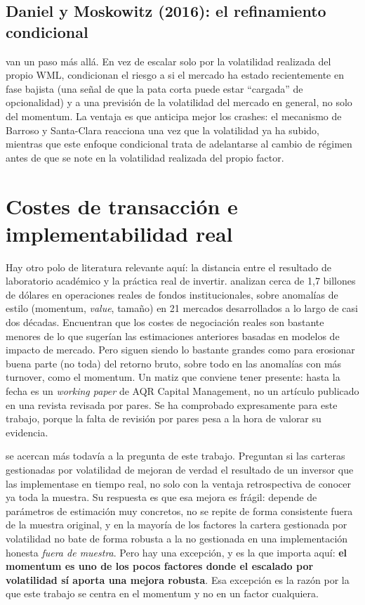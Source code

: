 \documentclass[12pt]{report} %
\begin{document}
\subsection{Daniel y Moskowitz (2016): el refinamiento condicional}

\citet{danielmoskowitz2016} van un paso más allá. En vez de escalar solo por la volatilidad realizada del propio WML, condicionan el riesgo a si el mercado ha estado recientemente en fase bajista (una señal de que la pata corta puede estar ``cargada'' de opcionalidad) y a una previsión de la volatilidad del mercado en general, no solo del momentum. La ventaja es que anticipa mejor los crashes: el mecanismo de Barroso y Santa-Clara reacciona una vez que la volatilidad ya ha subido, mientras que este enfoque condicional trata de adelantarse al cambio de régimen antes de que se note en la volatilidad realizada del propio factor.

\section{Costes de transacción e implementabilidad real}
\label{sec:costes-literatura}

Hay otro polo de literatura relevante aquí: la distancia entre el resultado de laboratorio académico y la práctica real de invertir. \citet{frazzini2018} analizan cerca de 1,7 billones de dólares en operaciones reales de fondos institucionales, sobre anomalías de estilo (momentum, \textit{value}, tamaño) en 21 mercados desarrollados a lo largo de casi dos décadas. Encuentran que los costes de negociación reales son bastante menores de lo que sugerían las estimaciones anteriores basadas en modelos de impacto de mercado. Pero siguen siendo lo bastante grandes como para erosionar buena parte (no toda) del retorno bruto, sobre todo en las anomalías con más turnover, como el momentum. Un matiz que conviene tener presente: hasta la fecha es un \textit{working paper} de AQR Capital Management, no un artículo publicado en una revista revisada por pares. Se ha comprobado expresamente para este trabajo, porque la falta de revisión por pares pesa a la hora de valorar su evidencia.

\citet{cederburg2020} se acercan más todavía a la pregunta de este trabajo. Preguntan si las carteras gestionadas por volatilidad de \citet{moreiramuir2017} mejoran de verdad el resultado de un inversor que las implementase en tiempo real, no solo con la ventaja retrospectiva de conocer ya toda la muestra. Su respuesta es que esa mejora es frágil: depende de parámetros de estimación muy concretos, no se repite de forma consistente fuera de la muestra original, y en la mayoría de los factores la cartera gestionada por volatilidad no bate de forma robusta a la no gestionada en una implementación honesta \textit{fuera de muestra}. Pero hay una excepción, y es la que importa aquí: \textbf{el momentum es uno de los pocos factores donde el escalado por volatilidad sí aporta una mejora robusta}. Esa excepción es la razón por la que este trabajo se centra en el momentum y no en un factor cualquiera.
\end{document}
